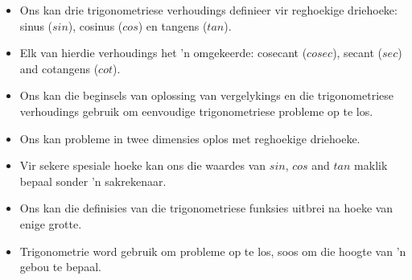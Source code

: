 \begin{itemize}[noitemsep]
\item Ons kan drie trigonometriese verhoudings definieer vir reghoekige driehoeke: sinus ($sin$), cosinus ($cos$) en tangens ($tan$).
\item Elk van hierdie verhoudings het 'n omgekeerde: cosecant ($cosec$), secant ($sec$) and cotangens ($cot$).
\item Ons kan die beginsels van oplossing van vergelykings en die trigonometriese verhoudings gebruik om eenvoudige trigonometriese probleme op te los.
\item Ons kan probleme in twee dimensies oplos met reghoekige driehoeke.
\item Vir sekere spesiale hoeke kan ons die waardes van $sin$, $cos$ and $tan$ maklik bepaal sonder 'n sakrekenaar.
\item Ons kan die definisies van die trigonometriese funksies uitbrei na hoeke van enige grotte.
\item Trigonometrie word gebruik om probleme op te los, soos om die hoogte van 'n gebou te bepaal.
\end{itemize}



